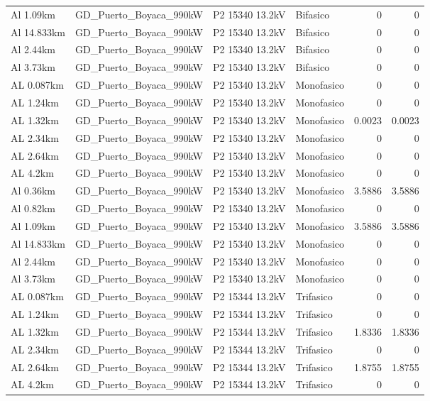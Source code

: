 \documentclass[11pt,a4paper]{article}
\begin{document}
\begin{longtable}{llllrr}
Al 1.09km & GD\_Puerto\_Boyaca\_990kW & P2 15340 13.2kV & Bifasico & 0 & 0 \\
Al 14.833km & GD\_Puerto\_Boyaca\_990kW & P2 15340 13.2kV & Bifasico & 0 & 0 \\
Al 2.44km & GD\_Puerto\_Boyaca\_990kW & P2 15340 13.2kV & Bifasico & 0 & 0 \\
Al 3.73km & GD\_Puerto\_Boyaca\_990kW & P2 15340 13.2kV & Bifasico & 0 & 0 \\
AL 0.087km & GD\_Puerto\_Boyaca\_990kW & P2 15340 13.2kV & Monofasico & 0 & 0 \\
AL 1.24km & GD\_Puerto\_Boyaca\_990kW & P2 15340 13.2kV & Monofasico & 0 & 0 \\
AL 1.32km & GD\_Puerto\_Boyaca\_990kW & P2 15340 13.2kV & Monofasico & 0.0023 & 0.0023 \\
AL 2.34km & GD\_Puerto\_Boyaca\_990kW & P2 15340 13.2kV & Monofasico & 0 & 0 \\
AL 2.64km & GD\_Puerto\_Boyaca\_990kW & P2 15340 13.2kV & Monofasico & 0 & 0 \\
AL 4.2km & GD\_Puerto\_Boyaca\_990kW & P2 15340 13.2kV & Monofasico & 0 & 0 \\
Al 0.36km & GD\_Puerto\_Boyaca\_990kW & P2 15340 13.2kV & Monofasico & 3.5886 & 3.5886 \\
Al 0.82km & GD\_Puerto\_Boyaca\_990kW & P2 15340 13.2kV & Monofasico & 0 & 0 \\
Al 1.09km & GD\_Puerto\_Boyaca\_990kW & P2 15340 13.2kV & Monofasico & 3.5886 & 3.5886 \\
Al 14.833km & GD\_Puerto\_Boyaca\_990kW & P2 15340 13.2kV & Monofasico & 0 & 0 \\
Al 2.44km & GD\_Puerto\_Boyaca\_990kW & P2 15340 13.2kV & Monofasico & 0 & 0 \\
Al 3.73km & GD\_Puerto\_Boyaca\_990kW & P2 15340 13.2kV & Monofasico & 0 & 0 \\
AL 0.087km & GD\_Puerto\_Boyaca\_990kW & P2 15344 13.2kV & Trifasico & 0 & 0 \\
AL 1.24km & GD\_Puerto\_Boyaca\_990kW & P2 15344 13.2kV & Trifasico & 0 & 0 \\
AL 1.32km & GD\_Puerto\_Boyaca\_990kW & P2 15344 13.2kV & Trifasico & 1.8336 & 1.8336 \\
AL 2.34km & GD\_Puerto\_Boyaca\_990kW & P2 15344 13.2kV & Trifasico & 0 & 0 \\
AL 2.64km & GD\_Puerto\_Boyaca\_990kW & P2 15344 13.2kV & Trifasico & 1.8755 & 1.8755 \\
AL 4.2km & GD\_Puerto\_Boyaca\_990kW & P2 15344 13.2kV & Trifasico & 0 & 0 \\

\end{longtable}
\end{document}
